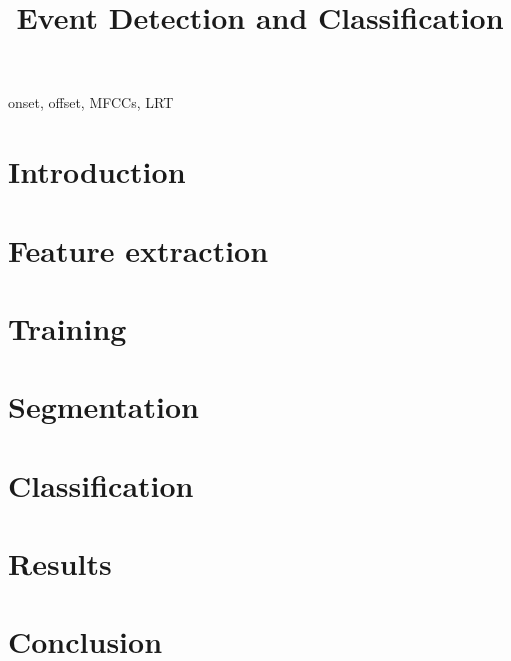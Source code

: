 \documentclass{article}
\title{Event Detection and Classification}
\begin{document}
\ninept
\maketitle

\begin{sloppy}

\begin{abstract}

\end{abstract}

\begin{keywords}
onset, offset, MFCCs, LRT
\end{keywords}

\section{Introduction}
\label{sec:intro}


\section{Feature extraction}
\label{sec:feature}


\section{Training}
\label{sec:training}


\section{Segmentation}
\label{sec:segmentation}


\section{Classification}
\label{sec:classification}


\section{Results}
\label{sec:results}


\section{Conclusion}
\label{sec:conclusion}





\end{sloppy}
\end{document}
